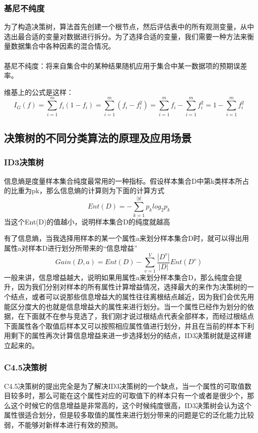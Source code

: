 \documentclass[18pt,a4paper,oneside,UTF8]{ctexart}
\begin{document}
\subsubsection{基尼不纯度}
为了构造决策树，算法首先创建一个根节点，然后评估表中的所有观测变量，从中选出最合适的变量对数据进行拆分。为了选择合适的变量，我们需要一种方法来衡量数据集合中各种因素的混合情况。
\paragraph{}
基尼不纯度：将来自集合中的某种结果随机应用于集合中某一数据项的预期误差率。\newline

维基上的公式是这样：\newline
\[
    I_G(f)=\sum_{i=1}^mf_i(1-f_i)=\sum_{i=1}^m(f_i-f_i^2)=\sum_{i=1}^mf_i-\sum_{i=1}^mf_i^2=1-\sum_{i=1}^mf_i^2
\]
\subsection{决策树的不同分类算法的原理及应用场景}
\subsubsection{ID3决策树}
信息熵是度量样本集合纯度最常用的一种指标。假设样本集合D中第k类样本所占的比重为pk，那么信息熵的计算则为下面的计算方式
\[
    Ent(D)=-\sum_{k=1}^{|y|}p_klog_2p_k    
\]
当这个Ent(D)的值越小，说明样本集合D的纯度就越高\newline

有了信息熵，当我选择用样本的某一个属性a来划分样本集合D时，就可以得出用属性a对样本D进行划分所带来的“信息增益”\newline
\[
    Gain(D,a)=Ent(D)-\sum_{v=1}^V \frac {|D^v|}{|D|}Ent(D^v)    
\]
一般来讲，信息增益越大，说明如果用属性a来划分样本集合D，那么纯度会提升，因为我们分别对样本的所有属性计算增益情况，选择最大的来作为决策树的一个结点，或者可以说那些信息增益大的属性往往离根结点越近，因为我们会优先用能区分度大的也就是信息增益大的属性来进行划分。当一个属性已经作为划分的依据，在下面就不在参与竞选了，我们刚才说过根结点代表全部样本，而经过根结点下面属性各个取值后样本又可以按照相应属性值进行划分，并且在当前的样本下利用剩下的属性再次计算信息增益来进一步选择划分的结点，ID3决策树就是这样建立起来的。
\subsubsection{C4.5决策树}
C4.5决策树的提出完全是为了解决ID3决策树的一个缺点，当一个属性的可取值数目较多时，那么可能在这个属性对应的可取值下的样本只有一个或者是很少个，那么这个时候它的信息增益是非常高的，这个时候纯度很高，ID3决策树会认为这个属性很适合划分，但是较多取值的属性来进行划分带来的问题是它的泛化能力比较弱，不能够对新样本进行有效的预测。
\end{document}
